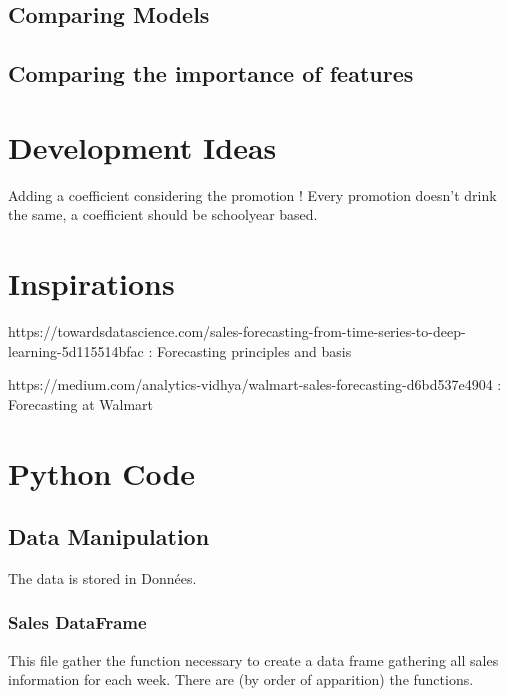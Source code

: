 \documentclass{report}
\begin{document}
\section{Comparing Models}








\section{Comparing the importance of features}


\chapter{Development Ideas}

Adding a coefficient considering the promotion ! Every promotion doesn't drink the same, a coefficient should be schoolyear based.






\chapter{Inspirations}

https://towardsdatascience.com/sales-forecasting-from-time-series-to-deep-learning-5d115514bfac : Forecasting principles and basis

https://medium.com/analytics-vidhya/walmart-sales-forecasting-d6bd537e4904 : Forecasting at Walmart






\chapter{Python Code}

\section{Data Manipulation}
The data is stored in Données.\\

\subsection{Sales DataFrame}

This file gather the function necessary to create a data frame gathering all sales information for each week. There are (by order of apparition) the functions.
\end{document}
